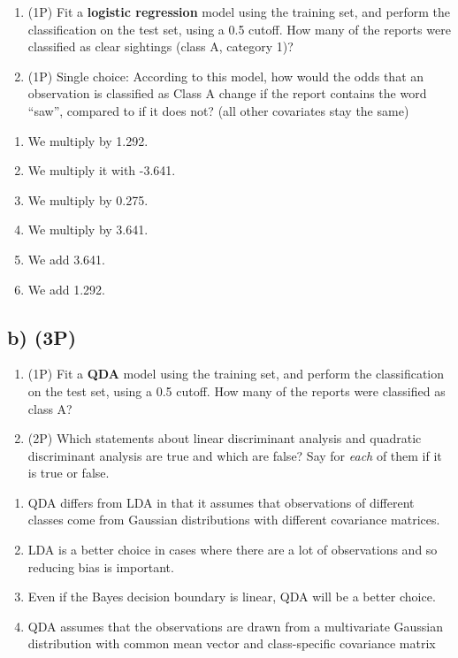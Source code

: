 \documentclass[
]{article}
\providecommand{\tightlist}{%
  \setlength{\itemsep}{0pt}\setlength{\parskip}{0pt}}
\begin{document}
\begin{enumerate}
\def\labelenumi{(\roman{enumi})}
\item
  (1P) Fit a \textbf{logistic regression} model using the training set,
  and perform the classification on the test set, using a 0.5 cutoff.
  How many of the reports were classified as clear sightings (class A,
  category 1)?
\item
  (1P) Single choice: According to this model, how would the odds that
  an observation is classified as Class A change if the report contains
  the word ``saw'', compared to if it does not? (all other covariates
  stay the same)
\end{enumerate}

\begin{enumerate}
\def\labelenumi{\arabic{enumi})}
\tightlist
\item
  We multiply by 1.292.
\item
  We multiply it with -3.641.
\item
  We multiply by 0.275.
\item
  We multiply by 3.641.
\item
  We add 3.641.
\item
  We add 1.292.
\end{enumerate}

\hypertarget{b-3p}{%
\subsection{b) (3P)}\label{b-3p}}

\begin{enumerate}
\def\labelenumi{(\roman{enumi})}
\item
  (1P) Fit a \textbf{QDA} model using the training set, and perform the
  classification on the test set, using a 0.5 cutoff. How many of the
  reports were classified as class A?
\item
  (2P) Which statements about linear discriminant analysis and quadratic
  discriminant analysis are true and which are false? Say for
  \emph{each} of them if it is true or false.
\end{enumerate}

\begin{enumerate}
\def\labelenumi{\arabic{enumi})}
\tightlist
\item
  QDA differs from LDA in that it assumes that observations of different
  classes come from Gaussian distributions with different covariance
  matrices.
\item
  LDA is a better choice in cases where there are a lot of observations
  and so reducing bias is important.
\item
  Even if the Bayes decision boundary is linear, QDA will be a better
  choice.
\item
  QDA assumes that the observations are drawn from a multivariate
  Gaussian distribution with common mean vector and class-specific
  covariance matrix
\end{enumerate}
\end{document}

